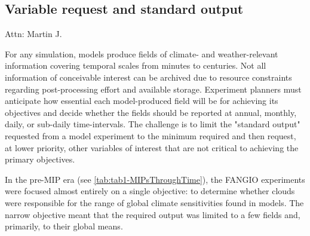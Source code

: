 \documentclass[gmd, preprint]{copernicus}
\newcommand{\mycomment}[1]{}
\def\cred#1{{\color{red}#1}}
\begin{document}
\subsection{Variable request and standard output}
\label{sec:CMIP6DR}
\cred{Attn: Martin J.}
\mycomment{Consider realm/frequency evolution across mip eras. RE: realm evolution, started in CMIP3 with tables (A1, O1, etc), built around the history files, from model components - so all ocean history files contained ocean, and sea ice variable, etc - Karl to augment; RE: frequencies, 3D fields, vs 2D fields were separated across tables as these had different temporal requests, to keep request sizes down; \autoref{tab:tab1-MIPsThroughTime} and \autoref{tab:tabAppB1-MIPStandardOutput}

Old: A critical component MIP experimentation is specifying what simulation output to save. It is a trade-off between the efforts required by modelling groups to fulfill a request, available storage, and existing and potential future science needs. Despite advancing technology, saving everything (i.e., all prognostic variables at every timestep) has never been realistic. In AMIP1/2, CMIP1/2/2+/3/5, consideration was made in consultation with MIP chairs and modelling groups about what questions or analyses will be pursued with a given simulation that dictates how much data is saved.

As MIPs emerged, more scientists began analyzing simulations, and it was not always clear a priori what would be studied.
}

For any simulation, models produce fields of climate- and weather-relevant information covering temporal scales from minutes to centuries. Not all information of conceivable interest can be archived due to resource constraints regarding post-processing effort and available storage. Experiment planners must anticipate how essential each model-produced field will be for achieving its objectives and decide whether the fields should be reported at annual, monthly, daily, or sub-daily time-intervals. The challenge is to limit the "standard output" requested from a model experiment to the minimum required and then request, at lower priority, other variables of interest that are not critical to achieving the primary objectives.

In the pre-MIP era (see \autoref{tab:tab1-MIPsThroughTime}), the FANGIO experiments were focused almost entirely on a single objective: to determine whether clouds were responsible for the range of global climate sensitivities found in models. The narrow objective meant that the required output was limited to a few fields and, primarily, to their global means.
\end{document}

